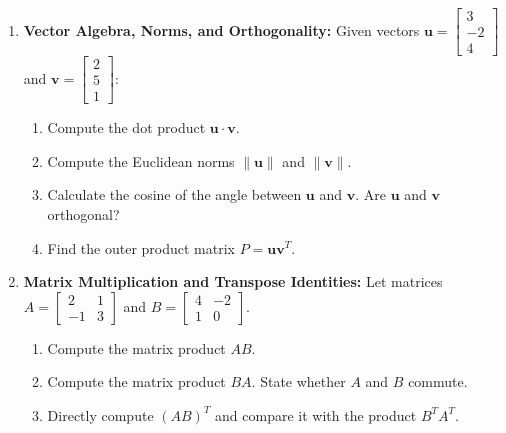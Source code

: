 \begin{enumerate}
    \item \textbf{Vector Algebra, Norms, and Orthogonality:}
    Given vectors $\mathbf{u} = \begin{bmatrix} 3 \\ -2 \\ 4 \end{bmatrix}$ and $\mathbf{v} = \begin{bmatrix} 2 \\ 5 \\ 1 \end{bmatrix}$:
    \begin{enumerate}
        \item Compute the dot product $\mathbf{u} \cdot \mathbf{v}$.
        \item Compute the Euclidean norms $\|\mathbf{u}\|$ and $\|\mathbf{v}\|$.
        \item Calculate the cosine of the angle between $\mathbf{u}$ and $\mathbf{v}$. Are $\mathbf{u}$ and $\mathbf{v}$ orthogonal?
        \item Find the outer product matrix $P = \mathbf{u} \mathbf{v}^T$.
    \end{enumerate}

    \item \textbf{Matrix Multiplication and Transpose Identities:}
    Let matrices $A = \begin{bmatrix} 2 & 1 \\ -1 & 3 \end{bmatrix}$ and $B = \begin{bmatrix} 4 & -2 \\ 1 & 0 \end{bmatrix}$.
    \begin{enumerate}
        \item Compute the matrix product $AB$.
        \item Compute the matrix product $BA$. State whether $A$ and $B$ commute.
        \item Directly compute $(AB)^T$ and compare it with the product $B^T A^T$.
    \end{enumerate}


\end{enumerate}
